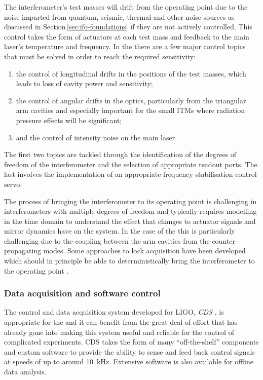 The interferometer's test masses will drift from the operating point due to the noise imparted from quantum, seismic, thermal and other noise sources as discussed in Section\,\ref{sec:ifo-foundations} if they are not actively controlled. This control takes the form of actuators at each test mass and feedback to the main laser's temperature and frequency. In the \SSMEXPT{} there are a few major control topics that must be solved in order to reach the required sensitivity:
\begin{enumerate}
  \item the control of longitudinal drifts in the positions of the test masses, which leads to loss of cavity power and sensitivity;
  \item the control of angular drifts in the optics, particularly from the triangular arm cavities and especially important for the small \glspl{ITM} where radiation pressure effects will be significant;
  \item and the control of intensity noise on the main laser.
\end{enumerate}
The first two topics are tackled through the identification of the degrees of freedom of the interferometer and the selection of appropriate readout ports. The last involves the implementation of an appropriate frequency stabilisation control servo.

The process of bringing the interferometer to its operating point is challenging in interferometers with multiple degrees of freedom and typically requires modelling in the time domain to understand the effect that changes to actuator signals and mirror dynamics have on the system. In the case of the \SSMEXPT{} this is particularly challenging due to the coupling between the arm cavities from the counter-propagating modes. Some approaches to lock acquisition have been developed which should in principle be able to deterministically bring the interferometer to the operating point \cite{Glaefke2015}.

\subsubsection{\label{sec:cds}Data acquisition and software control}
The control and data acquisition system developed for \gls{LIGO}, \emph{\gls{CDS}} \cite{Bork2010}, is appropriate for the \SSMEXPT{} and it can benefit from the great deal of effort that has already gone into making this system useful and reliable for the control of complicated experiments. \gls{CDS} takes the form of many ``off-the-shelf'' components and custom software to provide the ability to sense and feed back control signals at speeds of up to around \SI{10}{\kilo\hertz}. Extensive software is also available for offline data analysis.

